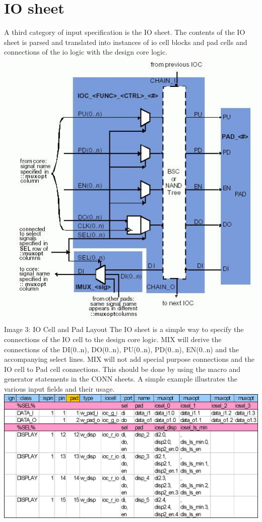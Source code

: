 \documentclass[a4paper,12pt]{article}
\begin{document}
\section{IO sheet}
A third category of input specification is the IO sheet. The contents of the IO sheet is parsed and translated into instances of io cell blocks and pad cells and connections of the io logic with the design core logic.\\
\includegraphics[scale=0.7]{images/mix_iocell.jpg}\\
Image 3: IO Cell and Pad Layout\newline
The IO sheet is a simple way to specify the connections of the IO cell to the design core logic. MIX will derive the connections of the DI(0..n), DO(0..n), PU(0..n), PD(0..n), EN(0..n) and the accompanying select lines. MIX will not add special purpose connections and the IO cell to Pad cell connections. This should be done by using the macro and generator statements in the CONN sheets.\newline
A simple example illustrates the various input fields and their usage.\\
\includegraphics[scale=0.4]{images/mix_io_sheet.jpg}\\
\end{document}

